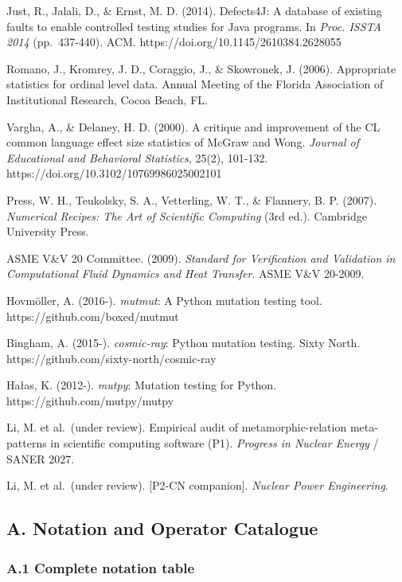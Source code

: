 \documentclass[review,12pt,authoryear]{elsarticle}
\begin{document}
Just, R., Jalali, D., \& Ernst, M. D. (2014). Defects4J: A database of
existing faults to enable controlled testing studies for Java programs.
In \emph{Proc. ISSTA 2014} (pp.~437-440). ACM.
https://doi.org/10.1145/2610384.2628055

Romano, J., Kromrey, J. D., Coraggio, J., \& Skowronek, J. (2006).
Appropriate statistics for ordinal level data. Annual Meeting of the
Florida Association of Institutional Research, Cocoa Beach, FL.

Vargha, A., \& Delaney, H. D. (2000). A critique and improvement of the
CL common language effect size statistics of McGraw and Wong.
\emph{Journal of Educational and Behavioral Statistics}, 25(2), 101-132.
https://doi.org/10.3102/10769986025002101

Press, W. H., Teukolsky, S. A., Vetterling, W. T., \& Flannery, B. P.
(2007). \emph{Numerical Recipes: The Art of Scientific Computing} (3rd
ed.). Cambridge University Press.

ASME V\&V 20 Committee. (2009). \emph{Standard for Verification and
Validation in Computational Fluid Dynamics and Heat Transfer}. ASME V\&V
20-2009.

Hovmöller, A. (2016-). \emph{mutmut}: A Python mutation testing tool.
https://github.com/boxed/mutmut

Bingham, A. (2015-). \emph{cosmic-ray}: Python mutation testing. Sixty
North. https://github.com/sixty-north/cosmic-ray

Hałas, K. (2012-). \emph{mutpy}: Mutation testing for Python.
https://github.com/mutpy/mutpy

Li, M. et al.~(under review). Empirical audit of metamorphic-relation
meta-patterns in scientific computing software (P1). \emph{Progress in
Nuclear Energy} / SANER 2027.

Li, M. et al.~(under review). {[}P2-CN companion{]}. \emph{Nuclear Power
Engineering}.

\appendix

\subsection{A. Notation and Operator
Catalogue}\label{a.-notation-and-operator-catalogue}

\subsubsection{A.1 Complete notation
table}\label{a.1-complete-notation-table}
\end{document}
